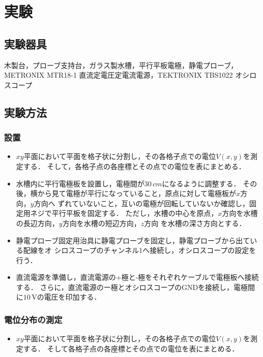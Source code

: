 
\section{実験}

\subsection{実験器具}
木製台，プローブ支持台，ガラス製水槽，平行平板電極，静電プローブ，METRONIX MTR18-1 直流定電圧定電流電源，TEKTRONIX TBS1022 オシロスコープ

\subsection{実験方法}
\subsubsection{設置}
\begin{itemize}
    \item $xy$平面において平面を格子状に分割し，その各格子点での電位$V(x,y)$を測定する．
    そして，各格子点の各座標とその点での電位を表にまとめる．
    \item 水槽内に平行電極板を設置し，電極間が$30\,\si{cm}$になるように調整する．
    その後，横から見て電極が平行になっていること，原点に対して電極板が$x$方向，$y$方向へ
    ずれていないこと，互いの電極が回転していないか確認し，固定用ネジで平行平板を固定する．
    ただし，水槽の中心を原点，$x$方向を水槽の長辺方向，$y$方向を水槽の短辺方向，$z$方向
    を水槽の深さ方向とする．
    \item 静電プローブ固定用治具に静電プローブを固定し，静電プローブから出ている配線をオ
    シロスコープのチャンネル1へ接続し，オシロスコープの設定を行う．
    \item 直流電源を準備し，直流電源の+極と-極をそれぞれケーブルで電極板へ接続する．
    さらに，直流電源のー極とオシロスコープのGNDを接続し，電極間に$10\,\si{\volt}$の電圧を印加する．    
\end{itemize}

\subsubsection{電位分布の測定}
\begin{itemize}
    \item $xy$平面において平面を格子状に分割し，その各格子点での電位$V(x,y)$を測定する．
    そして各格子点の各座標とその点での電位を表にまとめる．
\end{itemize}

